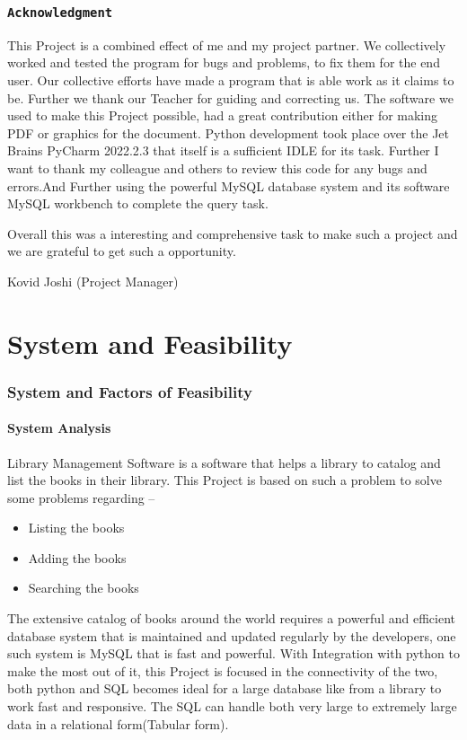 \documentclass[12pt, a4paper, titlepage, openany]{report}
\begin{document}
\newpage

\section*{ \centering \texttt{Acknowledgment}}
This Project is a combined effect of me and my project partner. We collectively worked and tested the program for bugs and problems, to fix them for the end user. Our collective efforts have made a program that is able work as it claims to be. Further we thank our Teacher for guiding and correcting us. The software we used to make this Project possible, had a great contribution either for making PDF or graphics for the document. Python development took place over the Jet Brains PyCharm 2022.2.3 that itself is a sufficient IDLE for its task. Further I want to thank my colleague and others to review this code for any bugs and errors.And Further using the powerful MySQL database system and its software MySQL workbench to complete the query task.

Overall this was a interesting and comprehensive task to make such a project and we are grateful to get such a opportunity.

{\flushright Kovid Joshi (Project Manager)} 

\newpage
\tableofcontents
\listoffigures
\newpage
\part{System and Feasibility}
\section{System and Factors of Feasibility}
\subsection{System Analysis}
Library Management Software is a software that helps a library to catalog and list the books in their library. This Project is based on such a problem to solve some problems regarding --
\begin{itemize}
\item Listing the books 
\item Adding the books
\item Searching the books
\end{itemize}
The extensive catalog of books around the world requires a powerful and efficient database system that is maintained and updated regularly by the developers, one such system is MySQL that is fast and powerful. With Integration with python to make the most out of it, this Project is focused in the connectivity of the two, both python and SQL becomes ideal for a large database like from a library to work fast and responsive. The SQL can handle both very large to extremely large data in a relational form(Tabular form). 
\end{document}
